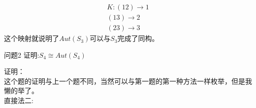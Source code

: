 \documentclass[utf8]{ctexart}
\begin{document}
\begin{equation} \nonumber
\begin{aligned}
K:(12)\rightarrow 1 \\
(13)\rightarrow 2\\
(23)\rightarrow 3
\end{aligned}
\end{equation}
这个映射就说明了$Aut(S_{3})$可以与$S_{3}$完成了同构。
\begin{mybox}[colback=white]{问题2}
证明:$ \textit{S}_{4} \cong Aut(\textit{S}_{4}) $
\end{mybox}
\noindent
证明：\\
这个题的证明与上一个题不同，当然可以与第一题的第一种方法一样枚举，但是我懒的举了。\\直接法二: \par\noindent



\end{document}
